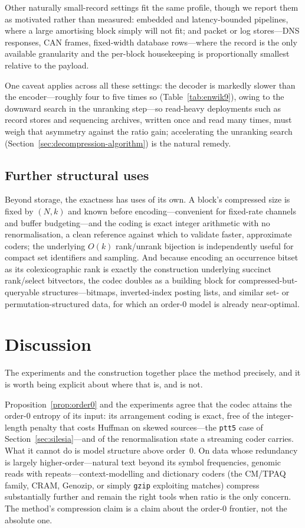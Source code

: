 \documentclass[entropy,article,submit,oneauthor,pdftex]{Definitions/mdpi}
\begin{document}
Other naturally small-record settings fit the same profile, though we report them as
motivated rather than measured: embedded and latency-bounded pipelines, where a large
amortising block simply will not fit; and packet or log stores---DNS responses, CAN
frames, fixed-width database rows---where the record is the only available granularity
and the per-block housekeeping is proportionally smallest relative to the payload.

One caveat applies across all these settings: the decoder is markedly slower than the
encoder---roughly four to five times so (Table~\ref{tab:enwik9}), owing to the downward
search in the unranking step---so read-heavy deployments such as record stores and
sequencing archives, written once and read many times, must weigh that asymmetry against
the ratio gain; accelerating the unranking search
(Section~\ref{sec:decompression-algorithm}) is the natural remedy.

\subsection{Further structural uses}
Beyond storage, the exactness has uses of its own. A block's compressed size is fixed by
$(N,k)$ and known before encoding---convenient for fixed-rate channels and buffer
budgeting---and the coding is exact integer arithmetic with no renormalisation, a clean
reference against which to validate faster, approximate coders; the underlying $O(k)$
rank/unrank bijection is independently useful for compact set identifiers and sampling.
And because encoding an occurrence bitset as its colexicographic rank is exactly the
construction underlying succinct rank/select bitvectors, the codec doubles as a building
block for compressed-but-queryable structures---bitmaps, inverted-index posting lists, and
similar set- or permutation-structured data, for which an order-$0$ model is already
near-optimal.
\section{Discussion}\label{sec:discussion}
The experiments and the construction together place the method precisely, and it
is worth being explicit about where that is, and is not.

Proposition~\ref{prop:order0} and the experiments agree that the codec attains the
order-$0$ entropy of its input: its arrangement coding is exact, free of the
integer-length penalty that costs Huffman on skewed sources---the \texttt{ptt5}
case of Section~\ref{sec:silesia}---and of the renormalisation state a streaming
coder carries. What it cannot do is model structure above order~$0$. On data whose
redundancy is largely higher-order---natural text beyond its symbol frequencies,
genomic reads with repeats---context-modelling and dictionary coders (the
CM/TPAQ family, CRAM, Genozip, or simply \texttt{gzip} exploiting matches) compress
substantially further and remain the right tools when ratio is the only concern.
The method's compression claim is a claim about the order-$0$ frontier, not the
absolute one.
\end{document}
